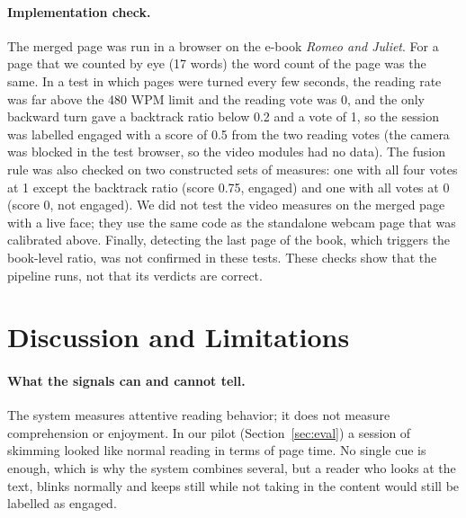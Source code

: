 \documentclass[sigconf,nonacm]{acmart}
\begin{document}
\paragraph{Implementation check.} The merged page was run in a browser on the e-book \emph{Romeo and Juliet}. For a page that
we counted by eye (17 words) the word count of the page was the same. In a test in which pages were turned every few
seconds, the reading rate was far above the 480 WPM limit and the reading vote was 0, and the only backward turn gave a backtrack
ratio below 0.2 and a vote of 1, so the session was labelled engaged with a score of 0.5 from the two reading votes
(the camera was blocked in the test browser, so the video modules had no data). The fusion rule was also checked on two
constructed sets of measures: one with all four votes at 1 except the backtrack ratio (score 0.75, engaged) and one with
all votes at 0 (score 0, not engaged). We did not test the video measures on the merged page with a live face; they use the
same code as the standalone webcam page that was calibrated above. Finally, detecting the last page of the book, which
triggers the book-level ratio, was not confirmed in these tests. These checks show that the pipeline runs, not that its verdicts are correct.

\section{Discussion and Limitations}\label{sec:discussion}
\paragraph{What the signals can and cannot tell.} The system measures attentive reading behavior; it does not measure
comprehension or enjoyment. In our pilot (Section~\ref{sec:eval}) a session of skimming looked like normal reading
in terms of page time. No single cue is enough, which is why the system combines several, but a reader who looks
at the text, blinks normally and keeps still while not taking in the content would still be labelled as engaged.
\end{document}

